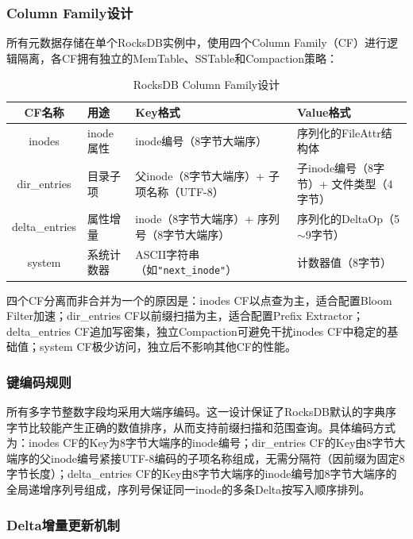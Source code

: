 \documentclass[supercite]{Hust-undergraduate-kaiti}
\theoremstyle{definition}
\begin{document}
\subsubsection{Column Family设计}

所有元数据存储在单个RocksDB实例中，使用四个Column Family（CF）进行逻辑隔离，各CF拥有独立的MemTable、SSTable和Compaction策略：

\begin{table}[htb]
\centering
\caption{RocksDB Column Family设计}
\label{tbl:cf}
\begin{tabular}{|c|p{2cm}|p{4.5cm}|p{4.5cm}|}
\hline
\textbf{CF名称} & \textbf{用途} & \textbf{Key格式} & \textbf{Value格式} \\
\hline
inodes & inode属性 & inode编号（8字节大端序） & 序列化的FileAttr结构体 \\
\hline
dir\_entries & 目录子项 & 父inode（8字节大端序）+ 子项名称（UTF-8） & 子inode编号（8字节）+ 文件类型（4字节） \\
\hline
delta\_entries & 属性增量 & inode（8字节大端序）+ 序列号（8字节大端序） & 序列化的DeltaOp（5$\sim$9字节） \\
\hline
system & 系统计数器 & ASCII字符串（如\texttt{"next\_inode"}） & 计数器值（8字节） \\
\hline
\end{tabular}
\end{table}

四个CF分离而非合并为一个的原因是：inodes CF以点查为主，适合配置Bloom Filter加速；dir\_entries CF以前缀扫描为主，适合配置Prefix Extractor；delta\_entries CF追加写密集，独立Compaction可避免干扰inodes CF中稳定的基础值；system CF极少访问，独立后不影响其他CF的性能。

\subsubsection{键编码规则}

所有多字节整数字段均采用大端序编码。这一设计保证了RocksDB默认的字典序字节比较能产生正确的数值排序，从而支持前缀扫描和范围查询。具体编码方式为：inodes CF的Key为8字节大端序的inode编号；dir\_entries CF的Key由8字节大端序的父inode编号紧接UTF-8编码的子项名称组成，无需分隔符（因前缀为固定8字节长度）；delta\_entries CF的Key由8字节大端序的inode编号加8字节大端序的全局递增序列号组成，序列号保证同一inode的多条Delta按写入顺序排列。

\subsubsection{Delta增量更新机制}
\end{document}
